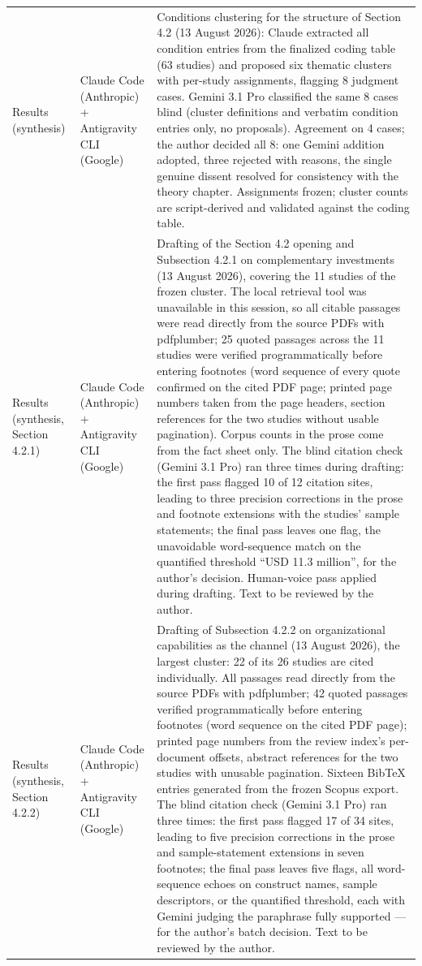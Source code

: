 \begin{longtable}{@{}p{2.9cm}p{3.2cm}p{9.0cm}@{}}
\addlinespace
Results (synthesis) & Claude Code (Anthropic) + Antigravity CLI (Google) & Conditions clustering for the structure of Section 4.2 (13 August 2026): Claude extracted all condition entries from the finalized coding table (63 studies) and proposed six thematic clusters with per-study assignments, flagging 8 judgment cases. Gemini 3.1 Pro classified the same 8 cases blind (cluster definitions and verbatim condition entries only, no proposals). Agreement on 4 cases; the author decided all 8: one Gemini addition adopted, three rejected with reasons, the single genuine dissent resolved for consistency with the theory chapter. Assignments frozen; cluster counts are script-derived and validated against the coding table. \\
\addlinespace
Results (synthesis, Section 4.2.1) & Claude Code (Anthropic) + Antigravity CLI (Google) & Drafting of the Section 4.2 opening and Subsection 4.2.1 on complementary investments (13 August 2026), covering the 11 studies of the frozen cluster. The local retrieval tool was unavailable in this session, so all citable passages were read directly from the source PDFs with pdfplumber; 25 quoted passages across the 11 studies were verified programmatically before entering footnotes (word sequence of every quote confirmed on the cited PDF page; printed page numbers taken from the page headers, section references for the two studies without usable pagination). Corpus counts in the prose come from the fact sheet only. The blind citation check (Gemini 3.1 Pro) ran three times during drafting: the first pass flagged 10 of 12 citation sites, leading to three precision corrections in the prose and footnote extensions with the studies' sample statements; the final pass leaves one flag, the unavoidable word-sequence match on the quantified threshold ``USD 11.3 million'', for the author's decision. Human-voice pass applied during drafting. Text to be reviewed by the author. \\
\addlinespace
Results (synthesis, Section 4.2.2) & Claude Code (Anthropic) + Antigravity CLI (Google) & Drafting of Subsection 4.2.2 on organizational capabilities as the channel (13 August 2026), the largest cluster: 22 of its 26 studies are cited individually. All passages read directly from the source PDFs with pdfplumber; 42 quoted passages verified programmatically before entering footnotes (word sequence on the cited PDF page); printed page numbers from the review index's per-document offsets, abstract references for the two studies with unusable pagination. Sixteen BibTeX entries generated from the frozen Scopus export. The blind citation check (Gemini 3.1 Pro) ran three times: the first pass flagged 17 of 34 sites, leading to five precision corrections in the prose and sample-statement extensions in seven footnotes; the final pass leaves five flags, all word-sequence echoes on construct names, sample descriptors, or the quantified threshold, each with Gemini judging the paraphrase fully supported --- for the author's batch decision. Text to be reviewed by the author. \\

\end{longtable}
